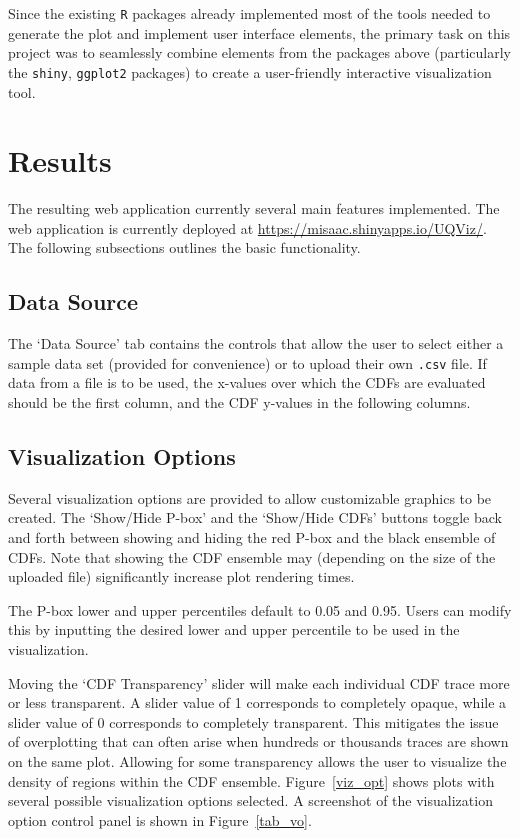 \documentclass[11pt]{asaproc}\usepackage[]{graphicx}\usepackage[]{color}
\begin{document}
Since the existing {\tt R} packages already implemented most of the tools needed to generate the plot and implement user interface elements, the primary task on this project was to seamlessly combine elements from the packages above (particularly the {\tt shiny}, {\tt ggplot2} packages) to create a user-friendly interactive visualization tool. 

\section{Results}
\label{Results}

The resulting web application currently several main features implemented. The web application is currently deployed at \url{https://misaac.shinyapps.io/UQViz/}. The following subsections outlines the basic functionality. 

\subsection{Data Source}
The `Data Source' tab contains the controls that allow the user to select either a sample data set (provided for convenience) or to upload their own {\tt .csv} file. If data from a file is to be used, the x-values over which the CDFs are evaluated should be the first column, and the CDF y-values in the following columns. 

\subsection{Visualization Options}
Several visualization options are provided to allow customizable graphics to be created. The `Show/Hide P-box' and the `Show/Hide CDFs' buttons toggle back and forth between showing and hiding the red P-box and the black ensemble of CDFs. Note that showing the CDF ensemble may (depending on the size of the uploaded file) significantly increase plot rendering times.

The P-box lower and upper percentiles default to 0.05 and 0.95. Users can modify this by inputting the desired lower and upper percentile to be used in the visualization. 

Moving the `CDF Transparency' slider will make each individual CDF trace more or less transparent. A slider value of 1 corresponds to completely opaque, while a slider value of 0 corresponds to completely transparent. This mitigates the issue of overplotting that can often arise when hundreds or thousands traces are shown on the same plot. Allowing for some transparency allows the user to visualize the density of regions within the CDF ensemble. Figure~\ref{viz_opt} shows plots with several possible visualization options selected. A screenshot of the visualization option control panel is shown in Figure~\ref{tab_vo}.
\end{document}
